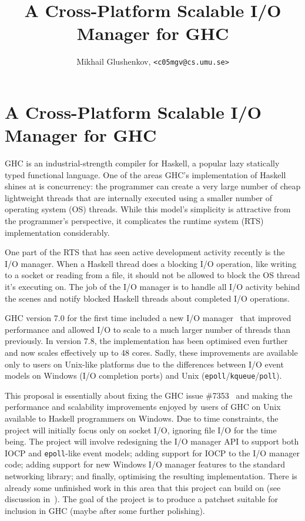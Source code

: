 \documentclass[10pt, oneside]{article}
\author{Mikhail Glushenkov, \texttt{<c05mgv@cs.umu.se>}}
\title{A Cross-Platform Scalable I/O Manager for GHC}
\begin{document}
\thispagestyle{empty}

\section*{A Cross-Platform Scalable I/O Manager for GHC}

GHC is an industrial-strength compiler for Haskell, a popular lazy statically
typed functional language. One of the areas GHC's implementation of Haskell
shines at is concurrency: the programmer can create a very large number of cheap
lightweight threads that are internally executed using a smaller number of
operating system (OS) threads. While this model's simplicity is attractive from
the programmer's perspective, it complicates the runtime system (RTS)
implementation considerably.

One part of the RTS that has seen active development activity recently is the
I/O manager. When a Haskell thread does a blocking I/O operation, like writing
to a socket or reading from a file, it should not be allowed to block the OS
thread it's executing on. The job of the I/O manager is to handle all I/O
activity behind the scenes and notify blocked Haskell threads about completed
I/O operations.

GHC version 7.0 for the first time included a new I/O manager~\cite{bib:tibell}
that improved performance and allowed I/O to scale to a much larger number of
threads than previously. In version 7.8, the implementation has been optimised
even further~\cite{bib:mio} and now scales effectively up to 48 cores. Sadly,
these improvements are available only to users on Unix-like platforms due to the
differences between I/O event models on Windows (I/O completion ports) and Unix
(\texttt{epoll}/\texttt{kqueue}/\texttt{poll}).

This proposal is essentially about fixing the GHC issue \#7353~\cite{bib:ticket}
and making the performance and scalability improvements enjoyed by users of GHC
on Unix available to Haskell programmers on Windows. Due to time constraints,
the project will initially focus only on socket I/O, ignoring file I/O for the
time being. The project will involve redesigning the I/O manager API to support
both IOCP and \texttt{epoll}-like event models; adding support for IOCP to the
I/O manager code; adding support for new Windows I/O manager features to the
standard networking library; and finally, optimising the resulting
implementation. There is already some unfinished work in this area that this
project can build on (see discussion in~\cite{bib:ticket}). The goal of the
project is to produce a patchset suitable for inclusion in GHC (maybe after some
further polishing).
\end{document}
